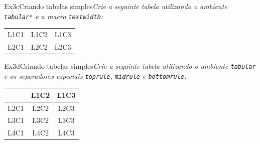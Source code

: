 \begin{texercise}{Ex3c}{Criando tabelas simples}\textit{Crie a seguinte tabela utilizando o ambiente \texttt{tabular*} e a macro {\tt textwidth}:}\par\smallskip%
\begin{tcboutputlisting}
\begin{tabular*}{\textwidth}{@{\extracolsep{\fill}}|l|c|r|}
\hline
L1C1 & L1C2 & L1C3 \\
L2C1 & L2C2 & L2C3 \\
\hline
\end{tabular*}
\end{tcboutputlisting}
\tcbuselistingtext%
\end{texercise}


\begin{texercise}{Ex3d}{Criando tabelas simples}\textit{Crie a seguinte tabela utilizando o ambiente \texttt{tabular} e os separadores especiais {\tt toprule}, {\tt midrule} e {\tt bottomrule}:}\par\smallskip%
\begin{tcboutputlisting}
\begin{tabular}[t]{lcc}
\toprule
     & L1C2 & L1C3 \\
\midrule
L2C1 & L2C2 & L2C3 \\
L3C1 & L3C2 & L3C3 \\
L4C1 & L4C2 & L4C3 \\
\bottomrule
\end{tabular}
\end{tcboutputlisting}
\tcbuselistingtext%
\end{texercise}

